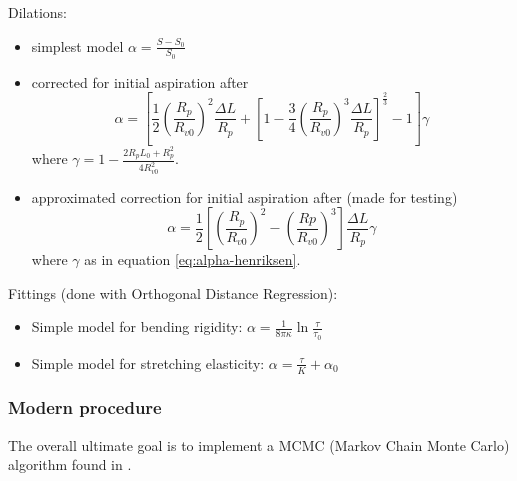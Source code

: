 Dilations:
\begin{itemize}
	\item simplest model $\alpha = \frac{S-S_0}{S_0}$
	\item corrected for initial aspiration after \cite{Henriksen2004}
	\begin{equation}
		\alpha = \left[
		 \frac{1}{2} \left(\frac{R_p}{R_{v0}}\right)^2 \frac{\Delta L}{R_p} 
		 + \left[1-\frac{3}{4}\left(\frac{R_p}{R_{v0}}\right)^3 \frac{\Delta L}{R_p} \right]^{\frac{2}{3}}
		 - 1 
		\right]\gamma
		\label{eq:alpha-henriksen}
	\end{equation}
	where $\displaystyle{\gamma = 1-\frac{2R_p L_0+R_p^2}{4R_{v0}^2}}$.
	\item approximated correction for initial aspiration after \cite{Henriksen2004} (made for testing)
	\begin{equation}
		\alpha = \frac{1}{2}\left[
		\left(\frac{R_p}{R_{v0}}\right)^2-\left(\frac{Rp}{R_{v0}}\right)^3\right]
		\frac{\Delta L}{R_p}\gamma
		\label{eq:alpha-henriksen-simple}
	\end{equation}
	where $\gamma$ as in equation \ref{eq:alpha-henriksen}.
\end{itemize}

Fittings (done with Orthogonal Distance Regression):
\begin{itemize}
	\item Simple model for bending rigidity: $\alpha=\frac{1}{8\pi\kappa}\ln{\frac{\tau}{\tau_0}}$
	\item Simple model for stretching elasticity: $\alpha=\frac{\tau}{K}+\alpha_0$
\end{itemize}

\subsubsection{Modern procedure}
The overall ultimate goal is to implement a MCMC (Markov Chain Monte Carlo) algorithm found in  \cite{Henriksen2004}.